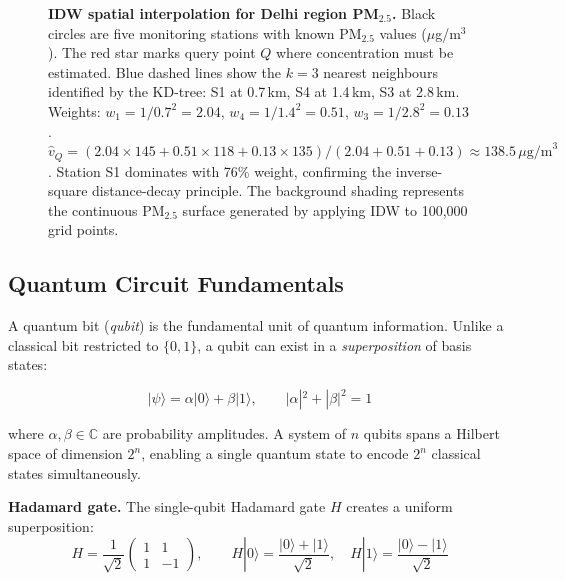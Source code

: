 \documentclass[12pt,a4paper]{article}
\newcommand{\ket}[1]{|#1\rangle}
\begin{document}
\begin{figure}[H]
\caption[IDW spatial interpolation schematic for Delhi region PM$_{2.5}$]{%
  \textbf{IDW spatial interpolation for Delhi region PM$_{2.5}$.}
  Black circles are five monitoring stations with known PM$_{2.5}$ values
  ($\mu$g/m$^3$). The red star marks query point $Q$ where concentration must
  be estimated. Blue dashed lines show the $k=3$ nearest neighbours identified
  by the KD-tree: S1 at 0.7\,km, S4 at 1.4\,km, S3 at 2.8\,km.
  Weights: $w_1 = 1/0.7^2 = 2.04$,
  $w_4 = 1/1.4^2 = 0.51$, $w_3 = 1/2.8^2 = 0.13$.
  $\hat{v}_Q = (2.04\times145 + 0.51\times118 + 0.13\times135)/(2.04+0.51+0.13)
  \approx 138.5\,\mu\text{g/m}^3$.
  Station S1 dominates with 76\% weight, confirming the inverse-square
  distance-decay principle. The background shading represents the continuous
  PM$_{2.5}$ surface generated by applying IDW to 100,000 grid points.}
\label{fig:idw}
\end{figure}

\subsection{Quantum Circuit Fundamentals}
\label{sec:background:quantum}

A quantum bit (\emph{qubit}) is the fundamental unit of quantum information.
Unlike a classical bit restricted to $\{0,1\}$, a qubit can exist in a
\emph{superposition} of basis states:

\begin{equation}
\ket{\psi} = \alpha\ket{0} + \beta\ket{1},
\qquad |\alpha|^2 + |\beta|^2 = 1
\label{eq:qubit}
\end{equation}

\noindent where $\alpha, \beta \in \mathbb{C}$ are probability amplitudes.
A system of $n$ qubits spans a Hilbert space of dimension $2^n$, enabling
a single quantum state to encode $2^n$ classical states simultaneously.

\noindent\textbf{Hadamard gate.}
The single-qubit Hadamard gate $H$ creates a uniform superposition:
\begin{equation}
H = \frac{1}{\sqrt{2}}\begin{pmatrix}1 & 1\\1 & -1\end{pmatrix},
\qquad
H\ket{0} = \frac{\ket{0}+\ket{1}}{\sqrt{2}},
\quad
H\ket{1} = \frac{\ket{0}-\ket{1}}{\sqrt{2}}
\label{eq:hadamard}
\end{equation}
\end{document}

